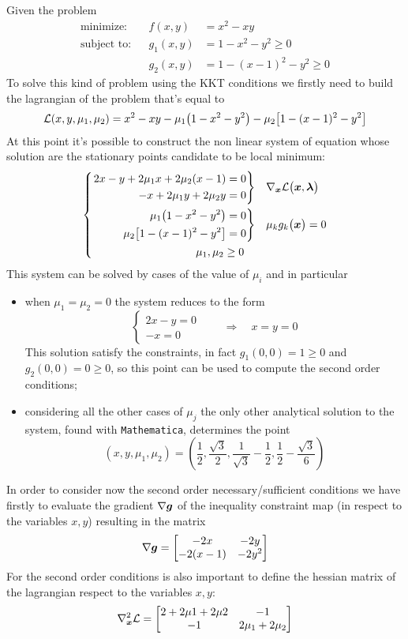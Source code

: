 	\begin{example}{}
		Given the problem
		\begin{align*}
			\textrm{minimize:}&&   f(x,y) &= x^2 - xy \\
			\textrm{subject to:}&& g_1(x,y) &=  1-x^2-y^2 \geq 0 \\ 
					&& g_2(x,y) &=  1- (x-1)^2-y^2 \geq 0
		\end{align*}
		To solve this kind of problem using the KKT conditions we firstly need to build the lagrangian of the problem that's equal to
		\[ \mathcal L(x,y,\mu_1,\mu_2) = x^2-xy - \mu_1 \big(1-x^2-y^2\big) - \mu_2 \big[ 1- (x-1)^2 - y^2 \big] \]
		At this point it's possible to construct the non linear system of equation whose solution are the stationary points candidate to be local minimum:
		\[\left\{\begin{aligned}
			\left. \begin{aligned}				
				2x - y +2\mu_1 x + 2\mu_2(x-1) &= 0 \\
				-x + 2 \mu_1 y +2 \mu_2 y &= 0
			\end{aligned} \right\} & \quad \nabla_{\boldsymbol{x}} \mathcal L\big(\boldsymbol{x}, \boldsymbol{\lambda}\big)  	\\		
			\left. \begin{aligned}
				\mu_1 \big(1-x^2-y^2\big) & = 0 \\
				\mu_2 \big[ 1- (x-1)^2 - y^2 \big] & = 0
			\end{aligned} \right\} &  \quad \mu_k g_k\big(\boldsymbol{x} \big) = 0\\
			\mu_1,\mu_2 \geq 0 \quad & 
		\end{aligned} \right.\]
		This system can be solved by cases of the value of $\mu_i$ and in particular
		\begin{itemize}
			\item when $\mu_1 = \mu_2 = 0$ the system reduces to the form
			\[ \begin{cases}
				2x - y = 0 \\ - x = 0
			\end{cases}  \qquad \Rightarrow \quad x = y = 0 \]
			This solution satisfy the constraints, in fact $g_1(0,0) = 1 \geq 0$ and $g_2(0,0) = 0 \geq 0$, so this point can be used to compute the second order conditions;
			
			\item considering all the other cases of $\mu_j$ the only other analytical solution to the system, found with \texttt{Mathematica}, determines the point
			\[ (x,y,\mu_1,\mu_2) = \left( \frac 1 2, \frac{\sqrt 3}{2}, \frac 1{\sqrt 3} - \frac 12 , \frac 1 2 - \frac{\sqrt 3}{6} \right) \]			
		\end{itemize}
		In order to consider now the second order necessary/sufficient conditions we have firstly to evaluate the gradient $\nabla \boldsymbol{g}$ of the inequality constraint map (in respect to the variables $x,y$) resulting in the matrix
		\[ \nabla \boldsymbol{g} = \begin{bmatrix}  -2x & -2y \\ -	2(x-1) & -2y^2  \end{bmatrix}\]
		For the second order conditions is also important to define the hessian matrix of the lagrangian respect to the variables $x,y$:
		\[ \nabla_{\boldsymbol{x}}^2 \mathcal L = \begin{bmatrix}  2 + 2\mu1 + 2 \mu2 & -1 \\ -1 & 2\mu_1 + 2\mu_2  \end{bmatrix}  \]
		

\end{example}
